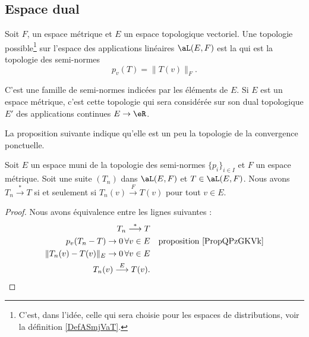 \subsection{Espace dual}

\begin{definition}  \label{DefHUelCDD}
    Soit \( F\), un espace métrique et \( E\) un espace topologique vectoriel. Une topologie possible\footnote{C'est, dans l'idée, celle qui sera choisie pour les espaces de distributions, voir la définition \ref{DefASmjVaT}.} sur l'espace des applications linéaires \( \aL(E,F)\) est la  qui est la topologie des semi-normes
    \begin{equation}
        p_v(T)=\| T(v) \|_F.
    \end{equation}
\end{definition}
C'est une famille de semi-normes indicées par les éléments de \( E\). Si \( E\) est un espace métrique, c'est cette topologie qui sera considérée sur son dual topologique \( E'\) des applications continues \( E\to \eR\).

La proposition suivante indique qu'elle est un peu la topologie de la convergence ponctuelle.
\begin{proposition}
    Soit \( E\) un espace muni de la topologie des semi-normes \( \{ p_i \}_{i\in I}\) et \( F\) un espace métrique. Soit une suite \( (T_n)\) dans \( \aL(E,F)\) et \( T\in \aL(E,F)\). Nous avons \( T_n\stackrel{*}{\longrightarrow}T\) si et seulement si \( T_n(v)\stackrel{F}{\longrightarrow}T(v)\) pour tout \( v\in E\).
\end{proposition}

\begin{proof}
    Nous avons équivalence entre les lignes suivantes :
    \begin{subequations}
        \begin{align}
            T_n\stackrel{*}{\longrightarrow}T\\
            p_v(T_n-T)\to 0\,\forall v\in E &&\text{proposition \ref{PropQPzGKVk}}\\
            \| T_n(v)-T(v) \|_E\to 0\,\forall v\in E\\
            T_n(v)\stackrel{E}{\longrightarrow}T(v).
        \end{align}
    \end{subequations}
\end{proof}

